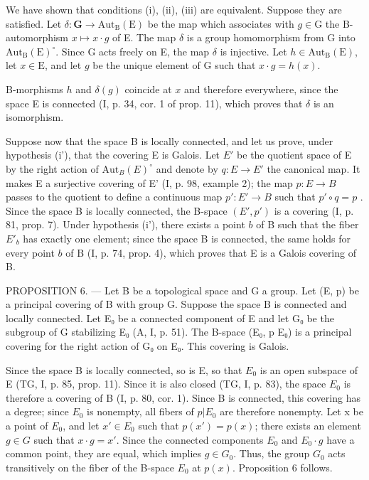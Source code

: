 We have shown that conditions (i), (ii), (iii) are equivalent. Suppose they are satisfied. Let \(\delta\colon\mathbf{G}\to\mathrm{Aut}_{\mathrm{B}}(\mathrm{E})\) be the map which associates with \(g\in\mathrm{G}\) the B-automorphism \(x\mapsto x\cdot g\) of E. The map \(\delta\) is a group homomorphism from G into \(\mathrm{Aut}_{\mathrm{B}}(\mathrm{E})^{\circ}\). Since G acts freely on E, the map \(\delta\) is injective. Let \(h\in\mathrm{Aut}_{\mathrm{B}}(\mathrm{E})\), let \(x\in\mathrm{E}\), and let \(g\) be the unique element of G such that \(x\cdot g=h(x)\).

B-morphisms \(h\) and \(\delta(g)\) coincide at \(x\) and therefore everywhere, since the space E is connected (I, p. 34, cor. 1 of prop. 11), which proves that \(\delta\) is an isomorphism.

Suppose now that the space B is locally connected, and let us prove, under hypothesis (i'), that the covering E is Galois. Let \(E'\) be the quotient space of E by the right action of \(\mathrm{Aut}_{B}(E)^{\circ}\) and denote by \(q\colon E \to E'\) the canonical map. It makes E a surjective covering of E' (I, p. 98, example 2); the map \(p\colon E \to B\) passes to the quotient to define a continuous map \(p'\colon E' \to B\) such that \(p'\circ q = p\) . Since the space B is locally connected, the B-space \((E', p')\) is a covering (I, p. 81, prop. 7). Under hypothesis (i'), there exists a point \(b\) of B such that the fiber \(E'_{b}\) has exactly one element; since the space B is connected, the same holds for every point \(b\) of B (I, p. 74, prop. 4), which proves that E is a Galois covering of B.

PROPOSITION 6. --- Let B be a topological space and G a group. Let (E, p) be a principal covering of B with group G. Suppose the space B is connected and locally connected. Let E₀ be a connected component of E and let G₀ be the subgroup of G stabilizing E₀ (A, I, p. 51). The B-space (E₀, p \textbar{} E₀) is a principal covering for the right action of G₀ on E₀. This covering is Galois.

Since the space B is locally connected, so is E, so that \(E_{0}\) is an open subspace of E (TG, I, p. 85, prop. 11). Since it is also closed (TG, I, p. 83), the space \(E_{0}\) is therefore a covering of B (I, p. 80, cor. 1). Since B is connected, this covering has a degree; since \(E_{0}\) is nonempty, all fibers of \(p|E_{0}\) are therefore nonempty. Let x be a point of \(E_{0}\), and let \(x' \in E_{0}\) such that \(p(x') = p(x)\); there exists an element \(g \in G\) such that \(x \cdot g = x'\). Since the connected components \(E_{0}\) and \(E_{0} \cdot g\) have a common point, they are equal, which implies \(g \in G_{0}\). Thus, the group \(G_{0}\) acts transitively on the fiber of the B-space \(E_{0}\) at \(p(x)\). Proposition 6 follows.

